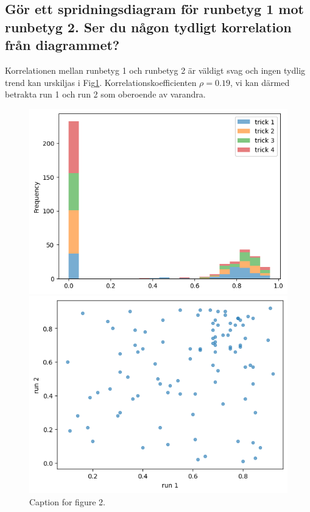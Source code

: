 \documentclass{article}
\begin{document}
\subsection{Gör ett spridningsdiagram för runbetyg 1 mot runbetyg 2. Ser du någon tydligt korrelation från diagrammet?}

Korrelationen mellan runbetyg 1 och runbetyg 2 är väldigt svag och ingen tydlig trend kan urskiljas i Fig\ref{fig:1e}.
Korrelationskoefficienten $\rho = 0.19$, vi kan därmed betrakta run 1 och run 2 som oberoende av varandra.

\clearpage  %

\begin{figure}[htbp]
    \centering
    
    \begin{minipage}{0.45\textwidth}
        \centering
        \includegraphics[width=\textwidth]{Figures/1b.png}
        \caption{Histogram för trickbetyg 1-4.}
        \label{fig:1b}
    \end{minipage}
    \hfill
    \begin{minipage}{0.45\textwidth}
        \centering
        \includegraphics[width=\textwidth]{Figures/1e.png}
        \caption{Caption for figure 2.}
        \label{fig:1e}
    \end{minipage}
    
\end{figure}
\end{document}
